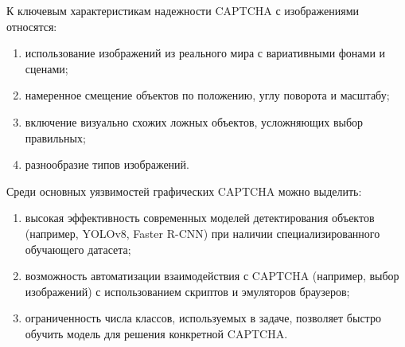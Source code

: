 К ключевым характеристикам надежности CAPTCHA с изображениями относятся:

\begin{enumerate}
    \item использование изображений из реального мира с вариативными фонами и 
    сценами;
    \item намеренное смещение объектов по положению, углу поворота и масштабу;
    \item включение визуально схожих ложных объектов, усложняющих выбор 
    правильных;
    \item разнообразие типов изображений.
\end{enumerate}

Среди основных уязвимостей графических CAPTCHA можно выделить:

\begin{enumerate}
    \item высокая эффективность современных моделей детектирования объектов 
    (например, YOLOv8, Faster R-CNN) при наличии специализированного обучающего 
    датасета;
    \item возможность автоматизации взаимодействия с CAPTCHA (например, выбор 
    изображений) с использованием скриптов и эмуляторов браузеров;
    \item ограниченность числа классов, используемых в задаче, позволяет быстро 
    обучить модель для решения конкретной CAPTCHA.
\end{enumerate}
